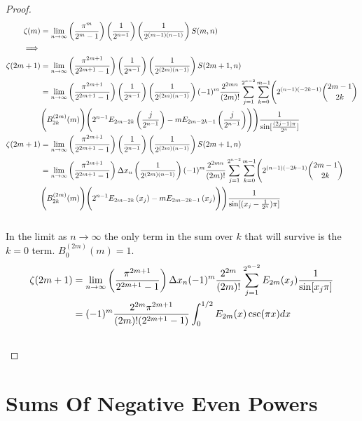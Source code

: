 \documentclass[fleqn,a4paper,9pt]{article}
\begin{document}
\begin{flushleft}
\begin{proof}
\begin{align}
\zeta(m)&=\lim_{n\to\infty}\left(\frac{\pi^m}{2^{m}-1}\right)\left(\frac{1}{2^{n-1}}\right) \left(\frac{1}{2^{(m-1)(n-1)}}\right)S(m,n) \\\notag
\implies &\\\notag
\zeta(2m+1)&=\lim_{n\to\infty}\left(\frac{\pi^{2m+1}}{2^{2m+1}-1}\right)\left(\frac{1}{2^{n-1}}\right) \left(\frac{1}{2^{(2m)(n-1)}}\right)S(2m+1,n) \\\notag
&=\lim_{n\to\infty}\left(\frac{\pi^{2m+1}}{2^{2m+1}-1}\right)\left(\frac{1}{2^{n-1}}\right) \left(\frac{1}{2^{(2m)(n-1)}}\right)(-1)^m\frac{2^{2mn}}{(2m)!}\sum_{j=1}^{2^{n-2}}\sum_{k=0}^{m-1}\Biggl(2^{(n-1)(-2k-1)}\binom{2m-1}{2k}\\\notag
&\Biggl(B_{2k}^{(2m)}(m)\Biggr)\Biggl(2^{n-1}E_{2m-2k}\left(\frac{j}{2^{n-1}}\right)-mE_{2m-2k-1}\left(\frac{j}{2^{n-1}}\right)\Biggr)\Biggr)\frac{1}{\sin[\frac{(2j-1)\pi}{2^n}]}\\\notag
\zeta(2m+1)&=\lim_{n\to\infty}\left(\frac{\pi^{2m+1}}{2^{2m+1}-1}\right)\left(\frac{1}{2^{n-1}}\right) \left(\frac{1}{2^{(2m)(n-1)}}\right)S(2m+1,n) \\\notag
&=\lim_{n\to\infty}\left(\frac{\pi^{2m+1}}{2^{2m+1}-1}\right)\Delta x_n\left(\frac{1}{2^{(2m)(n-1)}}\right)(-1)^m\frac{2^{2mn}}{(2m)!}\sum_{j=1}^{2^{n-2}}\sum_{k=0}^{m-1}\Biggl(2^{(n-1)(-2k-1)}\binom{2m-1}{2k}\\\notag
&\Biggl(B_{2k}^{(2m)}(m)\Biggr)\Biggl(2^{n-1}E_{2m-2k}\left(x_j\right)-mE_{2m-2k-1}\left(x_j\right)\Biggr)\Biggr)\frac{1}{\sin[(x_j-\frac{1}{2^n})\pi]}\\\notag
\end{align}
In the limit as $n\to\infty$ the only term in the sum over $k$ that will survive is the $k=0$ term. $B_0^{(2m)}(m)=1$.
\begin{align}
\zeta(2m+1)&=\lim_{n\to\infty}\left(\frac{\pi^{2m+1}}{2^{2m+1}-1}\right)\Delta x_n(-1)^m\frac{2^{2m}}{(2m)!}\sum_{j=1}^{2^{n-2}}E_{2m}(x_j)\frac{1}{\sin[x_j\pi]}\\\notag
&=(-1)^m\frac{2^{2m}\pi^{2m+1}}{(2m)!(2^{2m+1}-1)}\int_{0}^{1/2}E_{2m}(x)\csc (\pi  x)dx\\\notag
\end{align}
\end{proof}
\section{Sums Of Negative Even Powers}


\end{flushleft}
\end{document}

